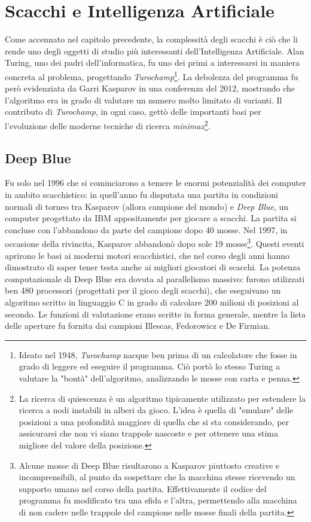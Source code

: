 \section{Scacchi e Intelligenza Artificiale}
Come accennato nel capitolo precedente, la complessità degli scacchi è ciò che li rende uno degli oggetti di studio più interessanti 
dell'Intelligenza Artificiale. Alan Turing, uno dei padri dell'informatica, fu uno dei primi a interessarsi in maniera concreta al problema, progettando 
\textit{Turochamp}\footnote{Ideato nel 1948, \textit{Turochamp} nacque ben prima di un calcolatore che fosse in grado di 
leggere ed eseguire il programma. Ciò portò lo stesso Turing a valutare la "bontà" dell'algoritmo, analizzando le mosse con carta e penna.}.
La debolezza del programma fu però evidenziata da Garri Kasparov in una conferenza del 2012, mostrando che l'algoritmo era 
in grado di valutare un numero molto limitato di varianti. Il contributo di \textit{Turochamp}, in ogni caso, gettò delle importanti basi 
per l'evoluzione delle moderne tecniche di ricerca \textit{minimax}\footnote{La ricerca di quiescenza è un algoritmo tipicamente utilizzato per estendere la ricerca a nodi instabili
in alberi da gioco. L'idea è quella di "emulare" delle posizioni a una profondità maggiore di quella che si sta considerando, per assicurarsi
che non vi siano trappole nascoste e per ottenere una stima migliore del valore della posizione.}. 
\subsection{Deep Blue}
Fu solo nel 1996 che si cominciarono a temere le enormi potenzialità dei computer in ambito scacchistico: in quell'anno fu disputata 
una partita in condizioni normali di torneo tra Kasparov (allora campione del mondo) e \textit{Deep Blue}, un computer progettato 
da IBM appositamente per giocare a scacchi. La partita si concluse con l'abbandono da parte del campione dopo 40 mosse. Nel 1997, in occasione della rivincita, 
Kasparov abbandonò dopo sole 19 mosse\footnote{Alcune mosse di Deep Blue risultarono a Kasparov piuttosto creative e incomprensibili,
al punto da sospettare che la macchina stesse ricevendo un supporto umano nel corso della partita. Effettivamente il codice del programma 
fu modificato tra una sfida e l'altra, permettendo alla macchina di non cadere nelle trappole del campione nelle mosse finali della partita.}. 
Questi eventi aprirono le basi ai moderni motori scacchistici, che nel corso degli anni hanno dimostrato di saper tener testa anche 
ai migliori giocatori di scacchi.
La potenza computazionale di Deep Blue era dovuta al parallelismo massivo: furono utilizzati ben 480 processori (progettati per il gioco degli 
scacchi), che eseguivano un algoritmo scritto in linguaggio C in grado di calcolare 200 milioni di posizioni al secondo. Le funzioni di 
valutazione erano scritte in forma generale, mentre la lista delle aperture fu fornita dai campioni Illescas, Fedorowicz e De Firmian.

